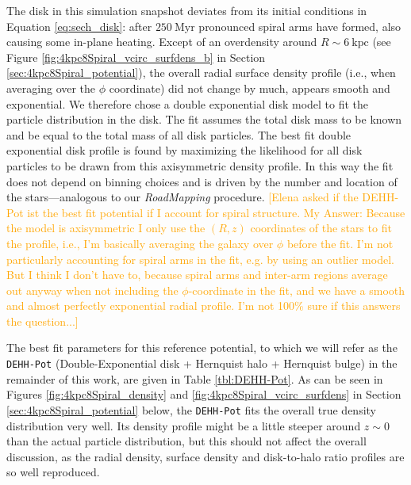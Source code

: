 \documentclass[iop,revtex4,numberedappendix,appendixfloats]{emulateapj}
\newcommand{\RM}{{\sl RoadMapping}}
\newcommand{\Elena}[1]{\textcolor{Orange}{#1}}
\begin{document}
The disk in this simulation snapshot deviates from its initial conditions in Equation \eqref{eq:sech_disk}: after $250~\text{Myr}$ pronounced spiral arms have formed, also causing some in-plane heating. Except of an overdensity around $R\sim6~\text{kpc}$ (see Figure \ref{fig:4kpc8Spiral_vcirc_surfdens_b} in Section \ref{sec:4kpc8Spiral_potential}), the overall radial surface density profile (i.e., when averaging over the $\phi$ coordinate) did not change by much, appears smooth and exponential. We therefore chose a double exponential disk model to fit the particle distribution in the disk. The fit assumes the total disk mass to be known and be equal to the total mass of all disk particles. The best fit double exponential disk profile is found by maximizing the likelihood for all disk particles to be drawn from this axisymmetric density profile. In this way the fit does not depend on binning choices and is driven by the number and location of the stars---analogous to our \RM{} procedure. \Elena{[Elena asked if the DEHH-Pot ist the best fit potential if I account for spiral structure. My Answer: Because the model is axisymmetric I only use the $(R,z)$ coordinates of the stars to fit the profile, i.e., I'm basically averaging the galaxy over $\phi$ before the fit. I'm not particularly accounting for spiral arms in the fit, e.g. by using an outlier model. But I think I don't have to, because spiral arms and inter-arm regions average out anyway when not including the $\phi$-coordinate in the fit, and we have a smooth and almost perfectly exponential radial profile. I'm not 100\% sure if this answers the question...]}

The best fit parameters for this reference potential, to which we will refer as the \texttt{DEHH-Pot} (Double-Exponential disk + Hernquist halo + Hernquist bulge) in the remainder of this work, are given in Table \ref{tbl:DEHH-Pot}. As can be seen in Figures \ref{fig:4kpc8Spiral_density} and \ref{fig:4kpc8Spiral_vcirc_surfdens} in Section \ref{sec:4kpc8Spiral_potential} below, the \texttt{DEHH-Pot} fits the overall true density distribution very well. Its density profile might be a little steeper around $z\sim 0$ than the actual particle distribution, but this should not affect the overall discussion, as the radial density, surface density and disk-to-halo ratio profiles are so well reproduced.
\end{document}
